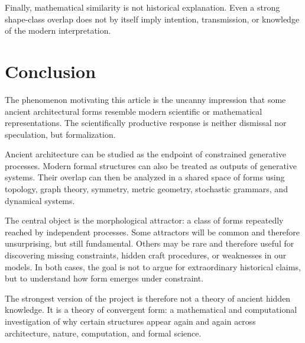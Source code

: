 Finally, mathematical similarity is not historical explanation. Even a strong shape-class overlap does not by itself imply intention, transmission, or knowledge of the modern interpretation.

\section{Conclusion}

The phenomenon motivating this article is the uncanny impression that some ancient architectural forms resemble modern scientific or mathematical representations. The scientifically productive response is neither dismissal nor speculation, but formalization.

Ancient architecture can be studied as the endpoint of constrained generative processes. Modern formal structures can also be treated as outputs of generative systems. Their overlap can then be analyzed in a shared space of forms using topology, graph theory, symmetry, metric geometry, stochastic grammars, and dynamical systems.

The central object is the morphological attractor: a class of forms repeatedly reached by independent processes. Some attractors will be common and therefore unsurprising, but still fundamental. Others may be rare and therefore useful for discovering missing constraints, hidden craft procedures, or weaknesses in our models. In both cases, the goal is not to argue for extraordinary historical claims, but to understand how form emerges under constraint.

The strongest version of the project is therefore not a theory of ancient hidden knowledge. It is a theory of convergent form: a mathematical and computational investigation of why certain structures appear again and again across architecture, nature, computation, and formal science.

\endgroup
